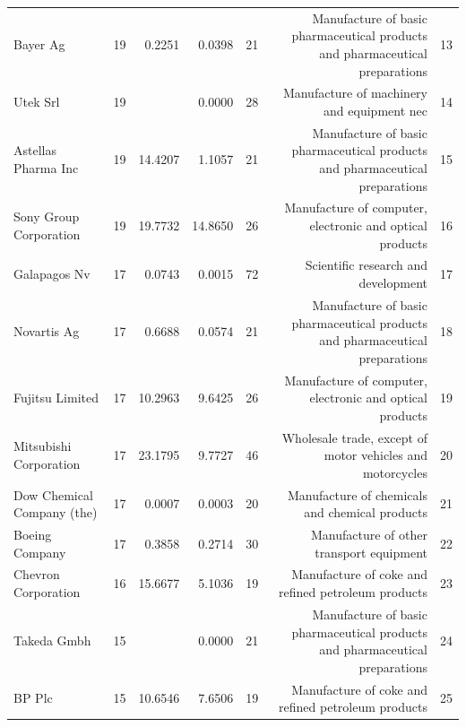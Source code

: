 \begin{table}[tbp]
{\begin{sideways}
\begin{threeparttable}
\begin{tabular}{lrrrrrr}
Bayer Ag & 19 & 0.2251 & 0.0398 & 21 & Manufacture of basic pharmaceutical products and pharmaceutical preparations & 13 \\ 
Utek Srl & 19 &  & 0.0000 & 28 & Manufacture of machinery and equipment nec & 14 \\ 
Astellas Pharma Inc & 19 & 14.4207 & 1.1057 & 21 & Manufacture of basic pharmaceutical products and pharmaceutical preparations & 15 \\ 
Sony Group Corporation & 19 & 19.7732 & 14.8650 & 26 & Manufacture of computer, electronic and optical products & 16 \\ 
Galapagos Nv & 17 & 0.0743 & 0.0015 & 72 & Scientific research and development & 17 \\ 
Novartis Ag & 17 & 0.6688 & 0.0574 & 21 & Manufacture of basic pharmaceutical products and pharmaceutical preparations & 18 \\ 
Fujitsu Limited & 17 & 10.2963 & 9.6425 & 26 & Manufacture of computer, electronic and optical products & 19 \\ 
Mitsubishi Corporation & 17 & 23.1795 & 9.7727 & 46 & Wholesale trade, except of motor vehicles and motorcycles & 20 \\ 
Dow Chemical Company (the) & 17 & 0.0007 & 0.0003 & 20 & Manufacture of chemicals and chemical products & 21 \\ 
Boeing Company & 17 & 0.3858 & 0.2714 & 30 & Manufacture of other transport equipment & 22 \\ 
Chevron Corporation & 16 & 15.6677 & 5.1036 & 19 & Manufacture of coke and refined petroleum products & 23 \\ 
Takeda Gmbh & 15 & & 0.0000 & 21 & Manufacture of basic pharmaceutical products and pharmaceutical preparations & 24 \\ 
BP Plc & 15 & 10.6546 & 7.6506 & 19 & Manufacture of coke and refined petroleum products & 25 \\ 

\end{tabular}
\end{threeparttable}
\end{sideways}}
\end{table}

